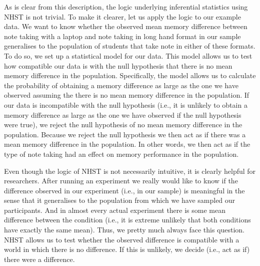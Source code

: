 \documentclass[
]{book}
\begin{document}
As is clear from this description, the logic underlying inferential statistics using NHST is not trivial. To make it clearer, let us apply the logic to our example data. We want to know whether the observed mean memory difference between note taking with a laptop and note taking in long hand format in our sample generalises to the population of students that take note in either of these formats. To do so, we set up a statistical model for our data. This model allows us to test how compatible our data is with the null hypothesis that there is no mean memory difference in the population. Specifically, the model allows us to calculate the probability of obtaining a memory difference as large as the one we have observed assuming the there is no mean memory difference in the population. If our data is incompatible with the null hypothesis (i.e., it is unlikely to obtain a memory difference as large as the one we have observed if the null hypothesis were true), we reject the null hypothesis of no mean memory difference in the population. Because we reject the null hypothesis we then act as if there was a mean memory difference in the population. In other words, we then act as if the type of note taking had an effect on memory performance in the population.

Even though the logic of NHST is not necessarily intuitive, it is clearly helpful for researchers. After running an experiment we really would like to know if the difference observed in our experiment (i.e., in our sample) is meaningful in the sense that it generalises to the population from which we have sampled our participants. And in almost every actual experiment there is some mean difference between the condition (i.e., it is extreme unlikely that both conditions have exactly the same mean). Thus, we pretty much always face this question. NHST allows us to test whether the observed difference is compatible with a world in which there is no difference. If this is unlikely, we decide (i.e., act as if) there were a difference.
\end{document}
